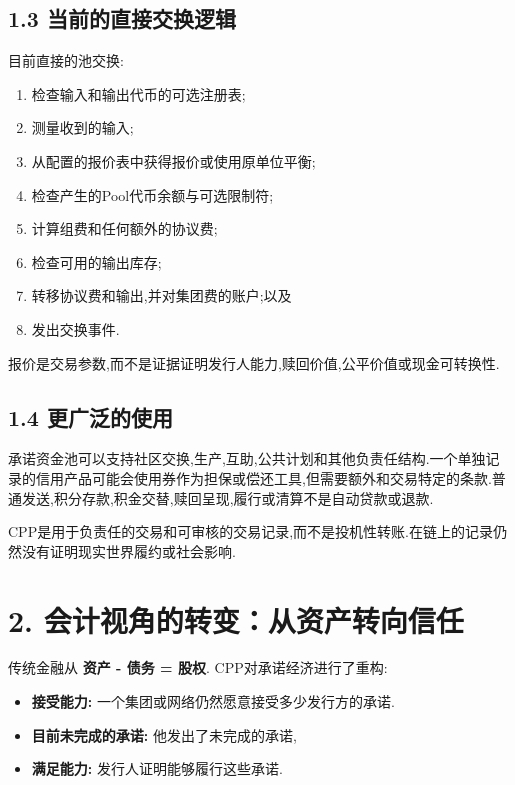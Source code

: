 \documentclass[11pt]{article}
\begin{document}
\subsection*{1.3 当前的直接交换逻辑}

目前直接的池交换:

\begin{enumerate}[leftmargin=*]
\item 检查输入和输出代币的可选注册表;
\item 测量收到的输入;
\item 从配置的报价表中获得报价或使用原单位平衡;
\item 检查产生的Pool代币余额与可选限制符;
\item 计算组费和任何额外的协议费;
\item 检查可用的输出库存;
\item 转移协议费和输出,并对集团费的账户;以及
\item 发出交换事件.
\end{enumerate}
报价是交易参数,而不是证据证明发行人能力,赎回价值,公平价值或现金可转换性.

\subsection*{1.4 更广泛的使用}

承诺资金池可以支持社区交换,生产,互助,公共计划和其他负责任结构.一个单独记录的信用产品可能会使用券作为担保或偿还工具,但需要额外和交易特定的条款.普通发送,积分存款,积金交替,赎回呈现,履行或清算不是自动贷款或退款.

CPP是用于负责任的交易和可审核的交易记录,而不是投机性转账.在链上的记录仍然没有证明现实世界履约或社会影响.


\section*{2. 会计视角的转变：从资产转向信任}

传统金融从 \textbf{资产 - 债务 = 股权}. CPP对承诺经济进行了重构:

\begin{itemize}[leftmargin=*]
\item \textbf{接受能力:} 一个集团或网络仍然愿意接受多少发行方的承诺.
\item \textbf{目前未完成的承诺:} 他发出了未完成的承诺,
\item \textbf{满足能力:} 发行人证明能够履行这些承诺.
\end{itemize}
\end{document}
